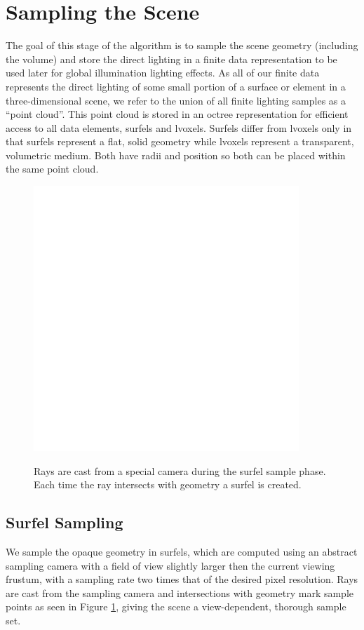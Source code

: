 \documentclass[12pt]{ucthesis}
\newcommand{\captionfonts}{\small\bf\ssp}
\begin{document}
\section{Sampling the Scene}
The goal of this stage of the algorithm is to sample the scene geometry (including the volume) and store the direct lighting in a finite data representation to be used later for global illumination lighting effects.  As all of our finite data represents the direct lighting of some small portion of a surface or element in a three-dimensional scene, we refer to the union of all finite lighting samples as a ``point cloud''.  This point cloud is stored in an octree representation for efficient access to all data elements, surfels and lvoxels.  Surfels differ from lvoxels only in that surfels represent a flat, solid geometry while lvoxels represent a transparent, volumetric medium.  Both have radii and position so both can be placed within the same point cloud.  

\begin{figure}[h!]
    \centering
    \includegraphics[width=100mm]{img/diag/surfel_samp.pdf}
    \captionfonts
    \caption{Rays are cast from a special camera during the surfel sample phase.  Each time the ray intersects with geometry a surfel is created.}
    \label{fig:surf_sample}
\end{figure}

\subsection{Surfel Sampling}

We sample the opaque geometry in surfels, which are computed using an abstract sampling camera with a field of view slightly larger then the current viewing frustum, with a sampling rate two times that of the desired pixel resolution.  Rays are cast from the sampling camera and intersections with geometry mark sample points as seen in Figure \ref{fig:surf_sample}, giving the scene a view-dependent, thorough sample set.
\end{document}
